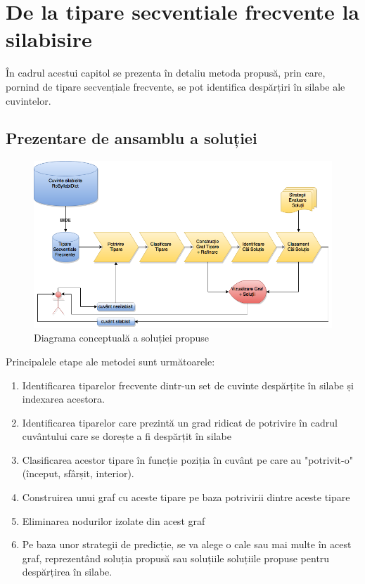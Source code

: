 \chapter{De la tipare secventiale frecvente la silabisire}
\label{cap:contributii}

În cadrul acestui capitol se prezenta în detaliu metoda propusă, prin care, pornind de tipare secvențiale frecvente, se pot identifica despărțiri în silabe ale cuvintelor.  

\section{Prezentare de ansamblu a soluției}

\begin{figure}[h]
    \centering
    \includegraphics[width=\textwidth]{figures/rosil-flow.png}
    \caption{Diagrama conceptuală a soluției propuse}
    \label{fig:rosil-flow}
\end{figure}

Principalele etape ale metodei sunt următoarele:
\begin{enumerate}
\item Identificarea tiparelor frecvente dintr-un set de cuvinte despărțite în silabe și indexarea acestora.
\item Identificarea tiparelor care prezintă un grad ridicat de potrivire în cadrul cuvântului care se dorește a fi despărțit în silabe
\item Clasificarea acestor tipare în funcție poziția în cuvânt pe care au "potrivit-o" (început, sfârșit, interior).
\item Construirea unui graf cu aceste tipare pe baza potrivirii dintre aceste tipare
\item Eliminarea nodurilor izolate din acest graf
\item Pe baza unor strategii de predicție, se va alege o cale sau mai multe în acest graf, reprezentând soluția propusă sau soluțiile soluțiile propuse pentru despărțirea în silabe.
\end{enumerate}

